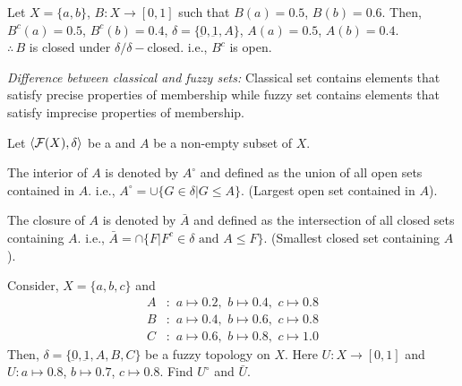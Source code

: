 \documentclass[../main-sheet.tex]{subfiles}
\begin{document}
\begin{ex}
    Let \(X=\{a,b \}\), \(B:X\to[0,1]\) such that \(B(a)=0.5\), \(B(b)=0.6\). Then, \(B^c(a)=0.5\), \(B^c(b)=0.4\), \(\delta=\{\underbar{0},\underbar{1},A\}\), \(A(a)=0.5\), \(A(b)=0.4\).\\
    \(\therefore\,B \) is closed under \(\delta/\delta-\)closed. i.e., \(B^c \) is open.
\end{ex}
\emph{Difference between classical and fuzzy sets: } Classical set contains elements that satisfy precise properties of membership while fuzzy set contains elements that satisfy imprecise properties of membership.
\begin{defn}
    Let \(\langle \mathcal{F}(X), \delta \rangle\) be a \fts and \(A \) be a non-empty subset of \(X \).

    The interior of \(A \) is denoted by \(A^\circ\) and defined as the union of all open sets contained in \(A \). i.e., \(A^\circ=\cup \{G\in\delta|G\leq A \}\). (Largest open set contained in \(A \)).

    The closure of \(A \) is denoted by \(\bar{A }\) and defined as the intersection of all closed sets containing \(A \). i.e., \(\bar{A }=\cap\{F|F^c\in\delta\text{ and }A\leq F \}\). (Smallest closed set containing \(A \)).
\end{defn}
\begin{ex}
    Consider, \(X=\{a,b,c \}\) and 
    \begin{align*}
        A&:\,\,a\mapsto 0.2,\,\, b\mapsto 0.4,\,\, c\mapsto 0.8\\
        B&:\,\,a\mapsto 0.4,\,\, b\mapsto 0.6,\,\, c\mapsto 0.8\\
        C&:\,\,a\mapsto 0.6,\,\, b\mapsto 0.8,\,\, c\mapsto 1.0
    \end{align*}
    Then, \(\delta=\{\underbar{0},\underbar{1},A,B,C \}\) be a fuzzy topology on \(X \). Here \(U:X\to[0,1]\) and \(U:a\mapsto0.8\), \(b\mapsto0.7\), \(c\mapsto 0.8\). Find \(U^\circ\) and \(\bar{U}\).
\end{ex}
\end{document}
